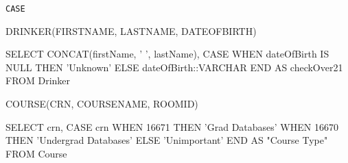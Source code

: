 \documentclass[aspectratio=169]{beamer}
\begin{document}
\begin{frame}[fragile]{\texttt{CASE}}

DRINKER(FIRSTNAME, LASTNAME, DATEOFBIRTH)

\begin{SQL}
SELECT CONCAT(firstName, ' ', lastName),
	CASE WHEN dateOfBirth IS NULL THEN 'Unknown' ELSE dateOfBirth::VARCHAR END  
	AS checkOver21
FROM Drinker
\end{SQL}

COURSE(CRN, COURSENAME, ROOMID)
\begin{SQL}
SELECT crn, 
	CASE crn
		WHEN 16671 THEN 'Grad Databases' 
   		WHEN 16670 THEN 'Undergrad Databases'
    		ELSE 'Unimportant' 
	END  AS "Course Type"
FROM Course
\end{SQL}

\end{frame}
\end{document}
